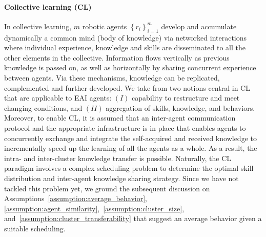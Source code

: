 \documentclass[12pt]{article}
\begin{document}
\paragraph*{\textbf{Collective learning (CL)}}
In collective learning, $m$ robotic agents $ \left\lbrace r_i \right\rbrace_{i=1}^{m} $  develop and accumulate dynamically a common mind (body of knowledge) via networked interactions where individual experience, knowledge and skills are disseminated to all the other elements in the collective. Information flows vertically as previous knowledge is passed on, as well as horizontally by sharing concurrent experience between agents. Via these mechanisms, knowledge can be replicated, complemented and further developed. We take from \cite{Garavan2012CollectiveLearning} two notions central in CL that are applicable to EAI agents:
$(I)$ capability to restructure and meet changing conditions, and $(II)$ aggregation of skills, knowledge, and behaviors. Moreover, to enable CL, it is assumed that an inter-agent communication protocol and the appropriate infrastructure is in place that enables agents to concurrently exchange and integrate the self-acquired and received knowledge to incrementally speed up the learning of all the agents as a whole. As a result, the intra- and inter-cluster knowledge transfer is possible. Naturally, the CL paradigm involves a complex scheduling problem to determine the optimal skill distribution and inter-agent knowledge sharing strategy. Since we have not tackled this problem yet, we ground the subsequent discussion on Assumptions~\ref{assumption:average_behavior}, \ref{assumption:agent_similarity},~\ref{assumption:cluster_size}, and~\ref{assumption:cluster_transferability} that suggest an average behavior given a suitable scheduling.
\end{document}
